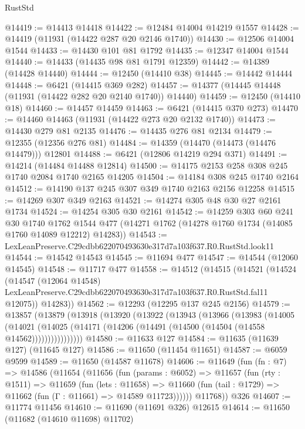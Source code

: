\begin{lexlean}{RustStd}
\begin{coremodule}
@14419 := @14413 @14418
@14422 := @12484 @14004 @14219 @1557
@14428 := @14419 (@11931 (@14422 @287 @20 @2146 @1740))
@14430 := @12506 @14004 @1544
@14433 := @14430 @101 @81 @1792
@14435 := @12347 @14004 @1544
@14440 := @14433 (@14435 @98 @81 @1791 @12359)
@14442 := @14389 (@14428 @14440)
@14444 := @12450 (@14410 @38)
@14445 := @14442 @14444
@14448 := @6421 (@14415 @369 @282)
@14457 := @14377 (@14445 @14448 (@11931 (@14422 @282 @20 @2140 @1740)) @14440)
@14459 := @12450 (@14410 @18)
@14460 := @14457 @14459
@14463 := @6421 (@14415 @370 @273)
@14470 := @14460 @14463 (@11931 (@14422 @273 @20 @2132 @1740))
@14473 := @14430 @279 @81 @2135
@14476 := @14435 @276 @81 @2134
@14479 := @12355 (@12356 @276 @81)
@14484 := @14359 (@14470 (@14473 (@14476 @14479))) @12801
@14488 := @6421 (@12806 @14219 @294 @371)
@14491 := @14214 (@14484 @14488 @12814)
@14500 := @14175 @2153 @258 @308 @245 @1740 @2084 @1740 @2165 @14205
@14504 := @14184 @308 @245 @1740 @2164
@14512 := @14190 @137 @245 @307 @349 @1740 @2163 @2156 @12258
@14515 := @14269 @307 @349 @2163
@14521 := @14274 @305 @48 @30 @27 @2161 @1734
@14524 := @14254 @305 @30 @2161
@14542 := @14259
    @303
    @60
    @241
    @30
    @1740
    @1762
    @1544
    @477
    (@14271 @1762 (@14278 @1760 @1734 (@14085 @1760 @14089 @12212) @14283))
@14543 := LexLeanPreserve.C29cdbb622070493630e317d7a103f637.R0.RustStd.look11
@14544 := @14542 @14543
@14545 := @11694 @477
@14547 := @14544 (@12060 @14545)
@14548 := @11717 @477
@14558 := @14512
    (@14515
      (@14521
        (@14524
          (@14547
            (@12064 @14548)
            LexLeanPreserve.C29cdbb622070493630e317d7a103f637.R0.RustStd.fal11
            @12075))
        @14283))
@14562 := @12293 (@12295 @137 @245 @2156)
@14579 := @13857
    (@13879
      (@13918
        (@13920
          (@13922
            (@13943
              (@13966
                (@13983
                  (@14005
                    (@14021
                      (@14025 (@14171 (@14206 (@14491 (@14500 (@14504 (@14558 @14562))))))))))))))))
@14580 := @11633 @127
@14584 := @11635 (@11639 @127) (@11645 @127)
@14586 := @11650 (@11454 @11651)
@14587 := @6059 @9599
@14589 := @11650 (@14587 @11678)
@14606 := @11649
    (fun (fn : @7) =>
    @14586
      (@11654
        (@11656
          (fun (params : @6052) =>
          @11657
            (fun (rty : @1511) =>
            @11659
              (fun (lets : @11658) =>
              @11660 (fun (tail : @1729) => @11662 (fun (Γ : @11661) => @14589 @11723))))))
        @11768))
    @326
@14607 := @11774 @11456
@14610 := @11690 (@11691 @326) @12615
@14614 := @11650 (@11682 (@14610 @11698) @11702)

\end{coremodule}
\end{lexlean}
